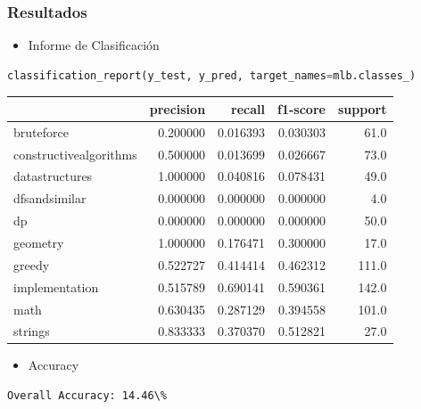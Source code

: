 \documentclass{article}
\begin{document}
\subsubsection{Resultados}
\begin{itemize}
    \item Informe de Clasificación
\end{itemize}
\begin{lstlisting}[language=Python, caption=Informe de Clasificación]
    classification_report(y_test, y_pred, target_names=mlb.classes_)
\end{lstlisting}

\begin{tabular}{lrrrr}
    \toprule
    {}                     & precision & recall   & f1-score & support \\
    \midrule
    bruteforce             & 0.200000  & 0.016393 & 0.030303 & 61.0    \\
    constructivealgorithms & 0.500000  & 0.013699 & 0.026667 & 73.0    \\
    datastructures         & 1.000000  & 0.040816 & 0.078431 & 49.0    \\
    dfsandsimilar          & 0.000000  & 0.000000 & 0.000000 & 4.0     \\
    dp                     & 0.000000  & 0.000000 & 0.000000 & 50.0    \\
    geometry               & 1.000000  & 0.176471 & 0.300000 & 17.0    \\
    greedy                 & 0.522727  & 0.414414 & 0.462312 & 111.0   \\
    implementation         & 0.515789  & 0.690141 & 0.590361 & 142.0   \\
    math                   & 0.630435  & 0.287129 & 0.394558 & 101.0   \\
    strings                & 0.833333  & 0.370370 & 0.512821 & 27.0    \\
    \bottomrule
\end{tabular}

\begin{itemize}
    \item Accuracy
\end{itemize}
\begin{verbatim}
Overall Accuracy: 14.46\%
\end{verbatim}
\end{document}

